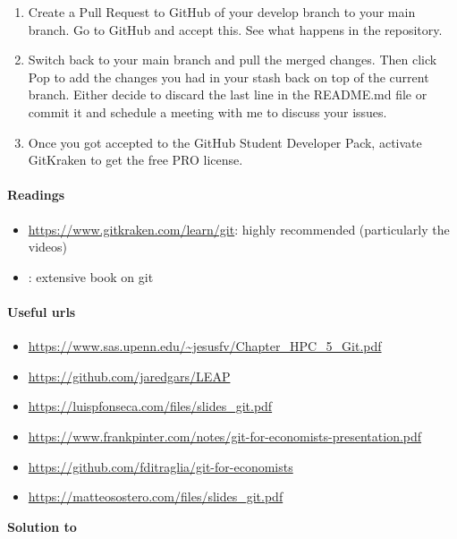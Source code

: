 \begin{enumerate}
	In GitKraken, simply right-click on the file you want to ignore and select how you want to ignore it.
	Do so for the just created auxiliary Latex files, but also for the generated pdf (as it is binary).
	Have a look into the newly created \texttt{.gitignore} file and commit it.\footnote{
		GitHub also has a collection of useful gitignore files for various programming languages at \url{https://github.com/github/gitignore}.}
	\item Create a Pull Request to GitHub of your develop branch to your main branch. Go to GitHub and accept this.
	See what happens in the repository.
	\item Switch back to your main branch and pull the merged changes.
	Then click Pop to add the changes you had in your stash back on top of the current branch.
	Either decide to discard the last line in the README.md file or commit it and schedule a meeting with me to discuss your issues.
	\item Once you got accepted to the GitHub Student Developer Pack, activate GitKraken to get the free PRO license.
\end{enumerate}


\paragraph{Readings}
\begin{itemize}
	\item \url{https://www.gitkraken.com/learn/git}: highly recommended (particularly the videos)
	\item \textcite{Chacon_2014_ProGit}: extensive book on git
\end{itemize}

\paragraph{Useful urls}
\begin{itemize}	
	\item \url{https://www.sas.upenn.edu/~jesusfv/Chapter_HPC_5_Git.pdf}
	\item \url{https://github.com/jaredgars/LEAP}
	\item \url{https://luispfonseca.com/files/slides_git.pdf}
	\item \url{https://www.frankpinter.com/notes/git-for-economists-presentation.pdf}
	\item \url{https://github.com/fditraglia/git-for-economists}
	\item \url{https://matteosostero.com/files/slides_git.pdf}
\end{itemize}

\begin{solution}\textbf{Solution to }
\ifDisplaySolutions

\fi
\newpage
\end{solution}